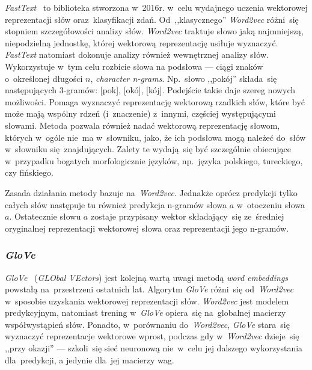 \documentclass[pl]{minipw} %
\begin{document}
\textit{FastText}~\cite{fasttext} to biblioteka stworzona w~2016r. w~celu wydajnego uczenia wektorowej reprezentacji słów oraz~klasyfikacji zdań. Od~,,klasycznego'' \textit{Word2vec} różni~się stopniem szczegółowości analizy słów. \textit{Word2vec} traktuje słowo jaką najmniejszą, niepodzielną jednostkę, której wektorową reprezentację usiłuje wyznaczyć. \textit{FastText} natomiast dokonuje analizy również wewnętrznej analizy słów. Wykorzystuje w~tym celu rozbicie słowa na podsłowa --- ciągi znaków o~określonej długości $n$, \textit{character n-grams}. Np.~słowo ,,pokój'' składa~się następujących 3-gramów: [pok], [okó], [kój]. Podejście takie daje szereg nowych możliwości. Pomaga wyznaczyć reprezentację wektorową rzadkich słów, które być może mają wspólny rdzeń (i~znaczenie) z~innymi, częściej występującymi słowami. Metoda pozwala również nadać wektorową reprezentację słowom, których w~ogóle nie~ma w~słowniku, jako, że ich podsłowa mogą należeć do~słów w~słowniku się~znajdujących. Zalety te wydają~się być szczególnie obiecujące w~przypadku bogatych morfologicznie języków, np.~języka polskiego, tureckiego, czy fińskiego.

Zasada działania metody bazuje na~\textit{Word2vec}. Jednakże oprócz predykcji tylko całych słów następuje tu również predykcja n-gramów słowa $a$ w~otoczeniu słowa $a$. Ostatecznie słowu $a$ zostaje przypisany wektor składający~się ze~średniej oryginalnej reprezentacji wektorowej słowa oraz reprezentacji jego n-gramów. 

\subsubsection{\textit{GloVe}}

\textit{GloVe}~\cite{glove} (\textit{GLObal VEctors}) jest kolejną wartą uwagi metodą \textit{word embeddings} powstałą na~przestrzeni ostatnich lat. Algorytm \textit{GloVe} różni~się od~\textit{Word2vec} w~sposobie uzyskania wektorowej reprezentacji słów. \textit{Word2vec} jest modelem predykcyjnym, natomiast trening w~\textit{GloVe} opiera~się na~globalnej macierzy współwystąpień słów. Ponadto, w~porównaniu do~\textit{Word2vec}, \textit{GloVe} stara~się wyznaczyć reprezentacje wektorowe wprost, podczas gdy w~\textit{Word2vec} dzieje~się ,,przy okazji'' --- szkoli~się sieć neuronową nie~w~celu jej dalszego wykorzystania dla~predykcji, a jedynie dla~jej macierzy wag. 
\end{document}

